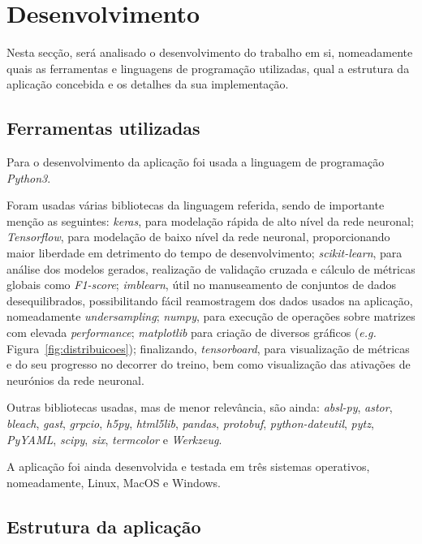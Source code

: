 \documentclass[]{article}
\begin{document}
\section{Desenvolvimento}
\label{sec:desenvolvimento}
Nesta secção, será analisado o desenvolvimento do trabalho em si, nomeadamente quais as ferramentas e linguagens de programação utilizadas, qual a estrutura da aplicação concebida e os detalhes da sua implementação.

\subsection{Ferramentas utilizadas}

Para o desenvolvimento da aplicação foi usada a linguagem de programação \textit{Python3}.

Foram usadas várias bibliotecas da linguagem referida, sendo de importante menção as seguintes: \textit{keras}, para modelação rápida de alto nível da rede neuronal; \textit{Tensorflow}, para modelação de baixo nível da rede neuronal, proporcionando maior liberdade em detrimento do tempo de desenvolvimento; \textit{scikit-learn}, para análise dos modelos gerados, realização de validação cruzada e cálculo de métricas globais como \textit{F1-score}; \textit{imblearn}, útil no manuseamento de conjuntos de dados desequilibrados, possibilitando fácil reamostragem dos dados usados na aplicação, nomeadamente \textit{undersampling}; \textit{numpy}, para execução de operações sobre matrizes com elevada \textit{performance}; \textit{matplotlib} para criação de diversos gráficos (\textit{e.g.} Figura~\ref{fig:distribuicoes}); finalizando, \textit{tensorboard}, para visualização de métricas e do seu progresso no decorrer do treino, bem como visualização das ativações de neurónios da rede neuronal.

Outras bibliotecas usadas, mas de menor relevância, são ainda: \textit{absl-py}, \textit{astor}, \textit{bleach}, \textit{gast}, \textit{grpcio}, \textit{h5py}, \textit{html5lib}, \textit{pandas}, \textit{protobuf}, \textit{python-dateutil}, \textit{pytz}, \textit{PyYAML}, \textit{scipy}, \textit{six}, \textit{termcolor} e \textit{Werkzeug}.

A aplicação foi ainda desenvolvida e testada em três sistemas operativos, nomeadamente, Linux, MacOS e Windows. 

\subsection{Estrutura da aplicação}
\end{document}
